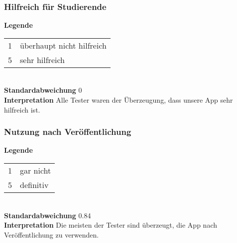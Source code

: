 \begin{frame}\frametitle{Hilfreich für Studierende}
    \begin{minipage}{\textwidth}
        \begin{minipage}{.49\textwidth}
        \end{minipage}
        \begin{minipage}{.49\textwidth}
            \textbf{Legende} 
            \begin{tabular}{l l}
                1 & überhaupt nicht hilfreich \\
                5 & sehr hilfreich
            \end{tabular} \\
            \textbf{Standardabweichung}
            0 \\
            \textbf{Interpretation}
            Alle Tester waren der Überzeugung, dass unsere App sehr hilfreich ist.
        \end{minipage}
    \end{minipage}
\end{frame}

\begin{frame}\frametitle{Nutzung nach Veröffentlichung}
    \begin{minipage}{\textwidth}
        \begin{minipage}{.49\textwidth}
        \end{minipage}
        \begin{minipage}{.49\textwidth}
            \textbf{Legende} 
            \begin{tabular}{l l}
                1 & gar nicht \\
                5 & definitiv
            \end{tabular} \\
            \textbf{Standardabweichung}
            0.84 \\
            \textbf{Interpretation}
            Die meisten der Tester sind überzeugt, die App nach Veröffentlichung zu verwenden.
        \end{minipage}
    \end{minipage}
\end{frame}

